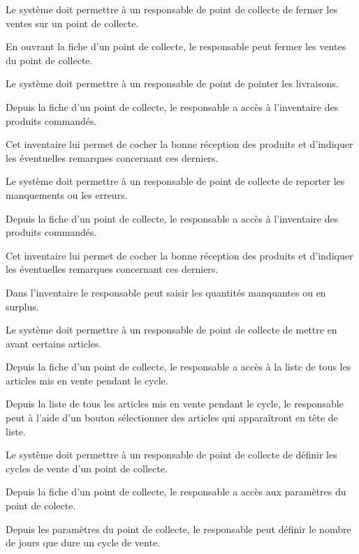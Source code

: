 \begin{reqf}{Le système doit permettre à un responsable de point de collecte de fermer les ventes sur un point de collecte.}
\item En ouvrant la fiche d'un point de collecte, le responsable peut fermer les ventes du point de collecte.
\end{reqf}

\begin{reqf}{Le système doit permettre à un responsable de point de pointer les livraisons.}
\item Depuis la fiche d'un point de collecte, le responsable a accès à l'inventaire des produits commandés.
\item Cet inventaire lui permet de cocher la bonne réception des produits et d'indiquer les éventuelles remarques concernant ces derniers.
\end{reqf}

\begin{reqf}{Le système doit permettre à un responsable de point de collecte de reporter les manquements ou les erreurs.}
\item Depuis la fiche d'un point de collecte, le responsable a accès à l'inventaire des produits commandés.
\item Cet inventaire lui permet de cocher la bonne réception des produits et d'indiquer les éventuelles remarques concernant ces derniers.
\item Dans l'inventaire le responsable peut saisir les quantités manquantes ou en surplus.
\end{reqf}

\begin{reqf}{Le système doit permettre à un responsable de point de collecte de mettre en avant certains articles.}
\item Depuis la fiche d'un point de collecte, le responsable a accès à la liste de tous les articles mis en vente pendant le cycle.
\item Depuis la liste de tous les articles mis en vente pendant le cycle, le responsable peut à l'aide d'un bouton sélectionner des articles qui apparaîtront en tête de liste.
\end{reqf}

\begin{reqf}{Le système doit permettre à un responsable de point de collecte de définir les cycles de vente d'un point de collecte.}
\item Depuis la fiche d'un point de collecte, le responsable a accès aux paramètres du point de colecte.
\item Depuis les paramètres du point de collecte, le responsable peut définir le nombre de jours que dure un cycle de vente.
\end{reqf}

